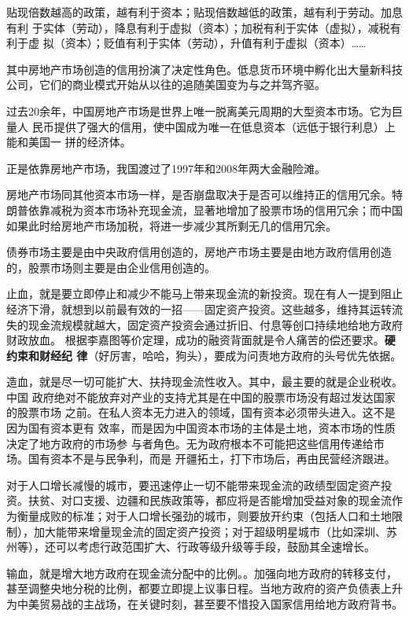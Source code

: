 
贴现倍数越高的政策，越有利于资本；贴现倍数越低的政策，越有利于劳动。加息有利
于实体（劳动），降息有利于虚拟（资本）；加税有利于实体（虚拟），减税有利于虚
拟（资本）；贬值有利于实体（劳动），升值有利于虚拟（资本）……

其中房地产市场创造的信用扮演了决定性角色。低息货币环境中孵化出大量新科技公司，它们的商业模式开始从以往的追随美国变为与之并驾齐驱。

过去20余年，中国房地产市场是世界上唯一脱离美元周期的大型资本市场。它为巨量人
民币提供了强大的信用，使中国成为唯一在低息资本（远低于银行利息）上能和美国一
拼的经济体。

正是依靠房地产市场，我国渡过了1997年和2008年两大金融险滩。

房地产市场同其他资本市场一样，是否崩盘取决于是否可以维持正的信用冗余。特朗普依靠减税为资本市场补充现金流，显著地增加了股票市场的信用冗余；而中国如果此时给房地产市场加税，将进一步减少其所剩无几的信用冗余。

债券市场主要是由中央政府信用创造的，房地产市场主要是由地方政府信用创造的，股票市场则主要是由企业信用创造的。

止血，就是要立即停止和减少不能马上带来现金流的新投资。现在有人一提到阻止经济下滑，就想到以前最有效的一招——固定资产投资。这些越多，维持其运转流失的现金流规模就越大，固定资产投资会通过折旧、付息等创口持续地给地方政府财政放血。
根据李嘉图等价定理，成功的融资背面就是令人痛苦的偿还要求。\textbf{硬约束和财经纪
  律}（好厉害，哈哈，狗头），要成为问责地方政府的头号优先依据。

造血，就是尽一切可能扩大、扶持现金流性收入。其中，最主要的就是企业税收。中国
政府绝对不能放弃对产业的支持尤其是在中国的股票市场没有超过发达国家的股票市场
之前。在私人资本无力进入的领域，国有资本必须带头进入。这不是因为国有资本更有
效率，而是因为中国资本市场的主体是土地，资本市场的性质决定了地方政府的市场参
与者角色。无为政府根本不可能把这些信用传递给市场。国有资本不是与民争利，而是
开疆拓土，打下市场后，再由民营经济跟进。

对于人口增长减慢的城市，要迅速停止一切不能带来现金流的政绩型固定资产投资。扶贫、对口支援、边疆和民族政策等，都应将是否能增加受益对象的现金流作为衡量成败的标准；对于人口增长强劲的城市，则要放开约束（包括人口和土地限制），加大能带来增量现金流的固定资产投资；对于超级明星城市（比如深圳、苏州等），还可以考虑行政范围扩大、行政等级升级等手段，鼓励其全速增长。

输血，就是增大地方政府在现金流分配中的比例。。加强向地方政府的转移支付，甚至调整央地分税的比例，都要立即提上议事日程。当地方政府的资产负债表上升为中美贸易战的主战场，在关键时刻，甚至要不惜投入国家信用给地方政府背书。

